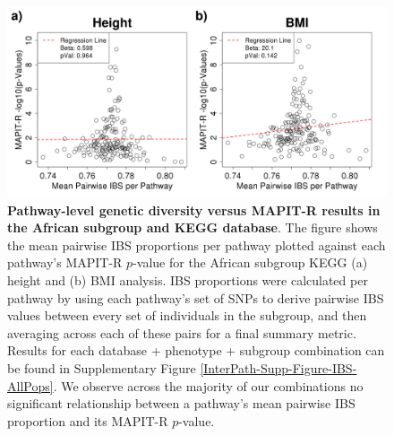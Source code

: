 \documentclass[12pt,a4paper]{article}
\begin{document}

\begin{figure}[htb]
\centering
\includegraphics[scale=.35]{Images/Main/InterPath_Main_Figure_IBS_vs4_African_noHLA.png}
\caption[TBD]{\textbf{Pathway-level genetic diversity versus MAPIT-R results in the African subgroup and KEGG database}. The figure shows the mean pairwise IBS proportions per pathway plotted against each pathway's MAPIT-R $p$-value for the African subgroup KEGG (a) height and (b) BMI analysis. IBS proportions were calculated per pathway by using each pathway's set of SNPs to derive pairwise IBS values between every set of individuals in the subgroup, and then averaging across each of these pairs for a final summary metric. Results for each database + phenotype + subgroup combination can be found in Supplementary Figure \ref{InterPath-Supp-Figure-IBS-AllPops}. We observe across the majority of our combinations no significant relationship between a pathway's mean pairwise IBS proportion and its MAPIT-R $p$-value.}
\label{InterPath-Main-Figure-IBS-African}
\end{figure}
\end{document}
